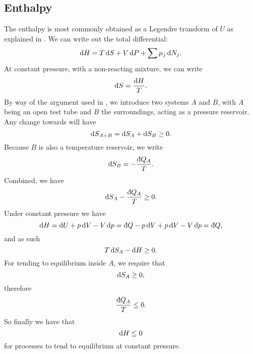 \subsection{Enthalpy}
The enthalpy is most commonly obtained as a Legendre transform of $U$ as explained in . We can write out the total differential:
\begin{equation}
\dif H=T\dif S+V\dif P+\sum\mu_j\dif N_j.
\end{equation}
At constant pressure, with a non-reacting mixture, we can write 
\begin{equation}
\dif S=\frac{\dif H}{T}.
\end{equation}
By way of the argument used in , we introduce two systems $A$ and $B$, 
with $A$ being an open test tube and $B$ the surroundings, acting as a pressure reservoir. Any change towards \eqm will have 
\begin{equation}
\dif S_{A+B}=\dif S_A+\dif S_B\geq0.
\end{equation}
Because $B$ is also a temperature reservoir, we write 
\begin{equation}
\dif S_B=-\frac{\indiff Q_A}{T}.
\end{equation}
Combined, we have
\begin{equation}
\dif S_A-\frac{\indiff Q_A}{T}\geq0.
\end{equation}
Under constant pressure we have
\begin{equation}
\dif H=\dif U+p\dif V-V\dif p=\indiff Q-p\dif V+p\dif V-V\dif p=\indiff Q, 
\end{equation}
and as such
\begin{equation}
T\dif S_A-\dif H\geq0. 
\end{equation}
For tending to equilibrium inside $A$, we require that
\begin{equation}
\dif S_A\geq0,
\end{equation}
therefore 
\begin{equation}
\frac{\indiff Q_A}{T}\leq0.
\end{equation}
So finally we have that
\begin{equation}
\dif H\leq0
\end{equation}
for processes to tend to equilibrium at constant pressure.
